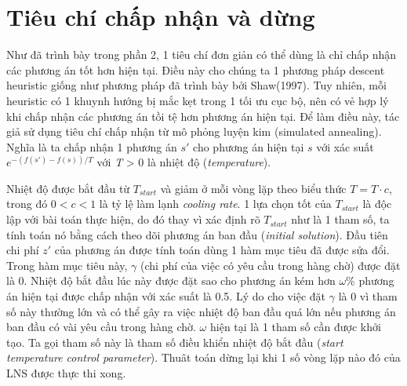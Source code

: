 \section{Tiêu chí chấp nhận và dừng}
Như đã trình bày trong phần 2, 1 tiêu chí đơn giản có thể dùng là chỉ chấp nhận các phương án tốt hơn hiện tại. Điều này cho chúng ta 1 phương pháp descent heuristic giống như phương pháp đã trình bày bởi Shaw(1997). Tuy nhiên, mỗi heuristic có 1 khuynh hướng bị mắc kẹt trong 1 tối ưu cục bộ, nên có vẻ hợp lý khi chấp nhận các phương án tồi tệ hơn phương án hiện tại. Để làm điều này, tác giả sử dụng tiêu chí chấp nhận từ mô phỏng luyện kim (simulated annealing). Nghĩa là ta chấp nhận 1 phương án $s'$ cho phương án hiện tại $s$ với xác suất $e^{-(f(s')-f(s))/T}$ với \textit{T} > 0 là nhiệt độ (\textit{temperature}).

Nhiệt độ được bắt đầu từ $T_{start}$ và giảm ở mỗi vòng lặp theo biểu thức $T=T \cdot c$, trong đó $0<c<1$ là tỷ lệ làm lạnh \textit{cooling rate}. 1 lựa chọn tốt của $T_{start}$ là độc lập với bài toán thực hiện, do đó thay vì xác định rõ $T_{start}$ như là 1 tham số, ta tính toán nó bằng cách theo dõi phương án ban đầu (\textit{initial solution}). Đầu tiên chi phí $z'$ của phương án được tính toán dùng 1 hàm mục tiêu đã được sửa đổi. Trong hàm mục tiêu này, $\gamma$ (chi phí của việc có yêu cầu trong hàng chờ) được đặt là 0. Nhiệt độ bắt đầu lúc này được đặt sao cho phương án kém hơn $\omega\%$ phương án hiện tại được chấp nhận với xác suất là 0.5. Lý do cho việc đặt $\gamma$ là 0 vì tham số này thường lớn và có thể gây ra việc nhiệt độ ban đầu quá lớn nếu phương án ban đầu có vài yêu cầu trong hàng chờ. $\omega$ hiện tại là 1 tham số cần được khởi tạo. Ta gọi tham số này là tham số điều khiển nhiệt độ bắt đầu (\textit{start temperature control parameter}). Thuât toán dừng lại khi 1 số vòng lặp nào đó của LNS được thực thi xong.
